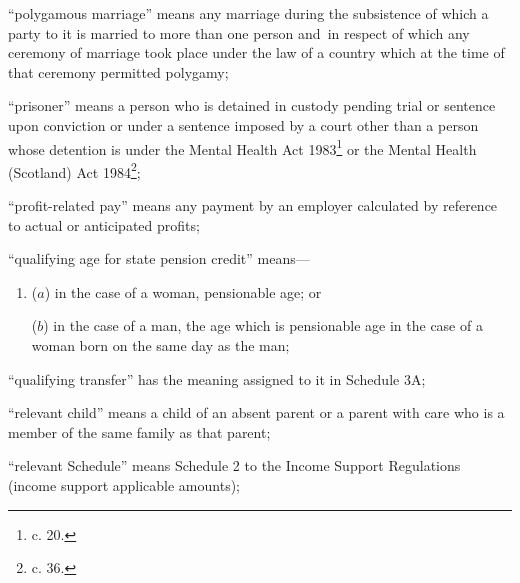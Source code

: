 \documentclass[12pt,a4paper]{article}
\begin{document}
\begin{enumerate}
“polygamous marriage” means any marriage during the subsistence of which a party to it is married to more than one person and~in respect of which any ceremony of marriage took place under the law of a country which at the time of that ceremony permitted polygamy;

“prisoner” means a person who is detained in custody pending trial or sentence upon conviction or under a sentence imposed by a court other than a person whose detention is under the Mental Health Act 1983\footnote{ c. 20.} or the Mental Health (Scotland) Act 1984\footnote{ c. 36.};

“profit-related pay” means any payment by an employer calculated by reference to actual or anticipated profits;

“qualifying age for state pension credit” means—
\begin{enumerate}\item[]
($a$) 
in the case of a woman, pensionable age; or

($b$) 
in the case of a man, the age which is pensionable age in the case of a woman born on the same day as the man;
\end{enumerate}

“qualifying transfer” has the meaning assigned to it in Schedule 3A;

“relevant child” means a child of an absent parent or a parent with care who is a member of the same family as that parent;

“relevant Schedule” means Schedule 2 to the Income Support Regulations (income support applicable amounts);

%
%


\end{enumerate}
\end{document}
